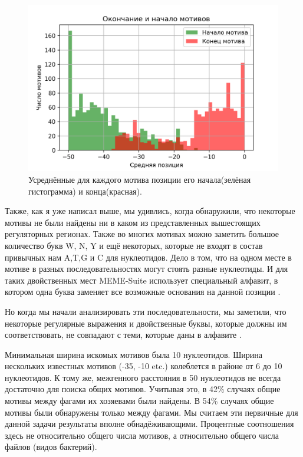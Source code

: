 \documentclass[14pt]{extarticle}
\begin{document}
    \begin{figure}[h]
        \centering
        \includegraphics[width=\textwidth]{img/_plot_.png}
        \caption{Усреднённые для каждого мотива позиции его начала(зелёная гистограмма) и конца(красная).}
        \label{fig:skybox}
    \end{figure}
    
    \par{Также, как я уже написал выше, мы удивлись, когда обнаружили, что некоторые мотивы не были найдены ни в каком 
    из представленных вышестоящих регуляторных регионах. Также во многих мотивах 
    можно заметить большое количество букв W, N, Y и ещё некоторых, которые не входят в состав привычных нам A,T,G и C 
    для нуклеотидов. Дело в том, что на одном месте в мотиве в разных последовательностях могут стоять разные 
    нуклеотиды. И для таких двойственных мест MEME-Suite использует специальный алфавит, в котором одна буква заменяет 
    все возможные основания на данной позиции \cite{memealphabet}. }
    
    \par{Но когда мы начали анализировать эти последовательности, мы заметили, что некоторые регулярные выражения и 
    двойственные буквы, которые должны им соответствовать, не совпадают с теми, которые даны в алфавите 
    \cite{memealphabet}.}
    
    \par{ Минимальная ширина искомых мотивов была 10 нуклеотидов. Ширина нескольких известных 
    мотивов (-35, -10 etc.) колеблется в районе от 6 до 10 нуклеотидов. К тому же, межгенного расстояния в 
    50 нуклеотидов не всегда достаточно для поиска общих мотивов. Учитывая это, в 42\% случаях общие мотивы между фагами
    их хозяевами были найдены. В 54\% случаях общие мотивы были обнаружены только между фагами. Мы считаем эти первичные
    для данной задачи результаты вполне обнадёживающими. Процентные соотношения здесь не относительно общего числа мотивов, а относительно общего числа файлов (видов бактерий).}
    
\end{document}

